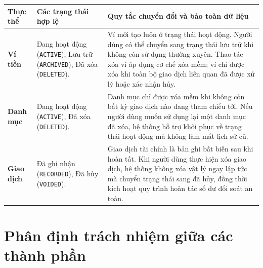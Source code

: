 \documentclass[a4paper,12pt]{report}
\newcommand{\passthrough}[1]{#1}
\newcounter{none}
\begin{document}
{\def\LTcaptype{none} %
\begin{longtable}[]{@{}
  >{\raggedright\arraybackslash}p{}
  >{\raggedright\arraybackslash}p{}
  >{\raggedright\arraybackslash}p{}@{}}
\toprule\noalign{}
\begin{minipage}[b]{\linewidth}\raggedright
Thực thể
\end{minipage} & \begin{minipage}[b]{\linewidth}\raggedright
Các trạng thái hợp lệ
\end{minipage} & \begin{minipage}[b]{\linewidth}\raggedright
Quy tắc chuyển đổi và bảo toàn dữ liệu
\end{minipage} \\
\midrule\noalign{}
\endhead
\bottomrule\noalign{}
\endlastfoot
\textbf{Ví tiền} & Đang hoạt động (\passthrough{\lstinline!ACTIVE!}),
Lưu trữ (\passthrough{\lstinline!ARCHIVED!}), Đã xóa
(\passthrough{\lstinline!DELETED!}). & Ví mới tạo luôn ở trạng thái hoạt
động. Người dùng có thể chuyển sang trạng thái lưu trữ khi không còn sử
dụng thường xuyên. Thao tác xóa ví áp dụng cơ chế xóa mềm; ví chỉ được
xóa khi toàn bộ giao dịch liên quan đã được xử lý hoặc xác nhận hủy. \\
\textbf{Danh mục} & Đang hoạt động (\passthrough{\lstinline!ACTIVE!}),
Đã xóa (\passthrough{\lstinline!DELETED!}). & Danh mục chỉ được xóa mềm
khi không còn bất kỳ giao dịch nào đang tham chiếu tới. Nếu người dùng
muốn sử dụng lại một danh mục đã xóa, hệ thống hỗ trợ khôi phục về trạng
thái hoạt động mà không làm mất lịch sử cũ. \\
\textbf{Giao dịch} & Đã ghi nhận (\passthrough{\lstinline!RECORDED!}),
Đã hủy (\passthrough{\lstinline!VOIDED!}). & Giao dịch tài chính là bản
ghi bất biến sau khi hoàn tất. Khi người dùng thực hiện xóa giao dịch,
hệ thống không xóa vật lý ngay lập tức mà chuyển trạng thái sang đã hủy,
đồng thời kích hoạt quy trình hoàn tác số dư đối soát an toàn. \\
\end{longtable}
}

\section{Phân định trách nhiệm giữa các thành
phần}\label{phuxe2n-ux111ux1ecbnh-truxe1ch-nhiux1ec7m-giux1eefa-cuxe1c-thuxe0nh-phux1ea7n}
\end{document}
